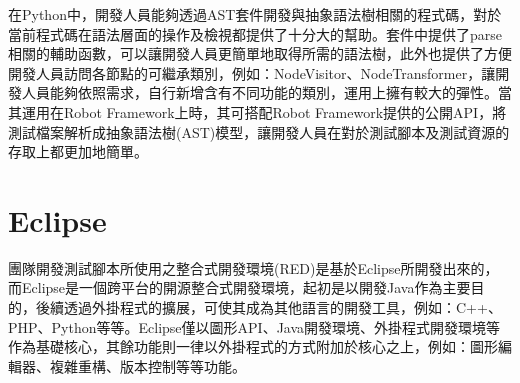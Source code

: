 \indent
在Python中，開發人員能夠透過AST套件\cite{ASTmodule}開發與抽象語法樹相關的程式碼，對於當前程式碼在語法層面的操作及檢視都提供了十分大的幫助。套件中提供了parse相關的輔助函數，可以讓開發人員更簡單地取得所需的語法樹，此外也提供了方便開發人員訪問各節點的可繼承類別，例如：NodeVisitor、NodeTransformer，讓開發人員能夠依照需求，自行新增含有不同功能的類別，運用上擁有較大的彈性。當其運用在Robot Framework上時，其可搭配Robot Framework提供的公開API，將測試檔案解析成抽象語法樹(AST)模型，讓開發人員在對於測試腳本及測試資源的存取上都更加地簡單。



%
%
%
%    
%
%

\section{Eclipse}\label{s2.4}
\indent
團隊開發測試腳本所使用之整合式開發環境(RED)是基於Eclipse所開發出來的，而Eclipse\cite{Eclipse}是一個跨平台的開源整合式開發環境，起初是以開發Java作為主要目的，後續透過外掛程式的擴展，可使其成為其他語言的開發工具，例如：C++、PHP、Python等等。Eclipse僅以圖形API、Java開發環境、外掛程式開發環境等作為基礎核心，其餘功能則一律以外掛程式的方式附加於核心之上，例如：圖形編輯器、複雜重構、版本控制等等功能。

